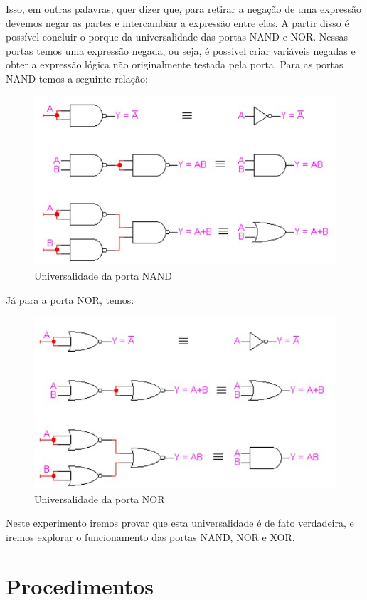 \documentclass[12pt]{article}
\begin{document}
Isso, em outras palavras, quer dizer que, para retirar a negação de uma expressão devemos negar as partes e intercambiar a expressão entre elas. A partir disso é possível concluir o porque da universalidade das portas NAND e NOR. Nessas portas temos uma expressão negada, ou seja, é possivel criar variáveis negadas e obter a expressão lógica não originalmente testada pela porta. Para as portas NAND temos a seguinte relação:

\begin{figure}[H]
	\centering
	\includegraphics[width=.5\textwidth]{portanand.jpg}
	\caption{Universalidade da porta NAND}
	\label{fig:exemplo}
\end{figure}

Já para a porta NOR, temos:

\begin{figure}[H]
	\centering
	\includegraphics[width=.5\textwidth]{portanor.jpg}
	\caption{Universalidade da porta NOR}
	\label{fig:exemplo}
\end{figure}

Neste experimento iremos provar que esta universalidade é de fato verdadeira, e iremos explorar o funcionamento das portas NAND, NOR e XOR.



\section{Procedimentos}
\label{sec:Procedimentos}
\end{document}
